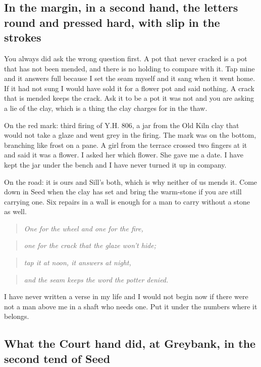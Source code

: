 \documentclass{design/chronicle}
\begin{document}
\subsection*{In the margin, in a second hand, the letters round and pressed hard, with slip in the strokes}

You always did ask the wrong question first. A pot that never cracked is a pot that has not been mended, and there is no holding to compare with it. Tap mine and it answers full because I set the seam myself and it sang when it went home. If it had not sung I would have sold it for a flower pot and said nothing. A crack that is mended keeps the crack. Ask it to be a pot it was not and you are asking a lie of the clay, which is a thing the clay charges for in the thaw.

On the red mark: third firing of Y.H. 806, a jar from the Old Kiln clay that would not take a glaze and went grey in the firing. The mark was on the bottom, branching like frost on a pane. A girl from the terrace crossed two fingers at it and said it was a flower. I asked her which flower. She gave me a date. I have kept the jar under the bench and I have never turned it up in company.

On the road: it is ours and Sill’s both, which is why neither of us mends it. Come down in Seed when the clay has set and bring the warm-stone if you are still carrying one. Six repairs in a wall is enough for a man to carry without a stone as well.

\begin{quote}\itshape One for the wheel and one for the fire,\end{quote}

\begin{quote}\itshape one for the crack that the glaze won’t hide;\end{quote}

\begin{quote}\itshape tap it at noon, it answers at night,\end{quote}

\begin{quote}\itshape and the seam keeps the word the potter denied.\end{quote}

I have never written a verse in my life and I would not begin now if there were not a man above me in a shaft who needs one. Put it under the numbers where it belongs.

\subsection*{What the Court hand did, at Greybank, in the second tend of Seed}
\end{document}
